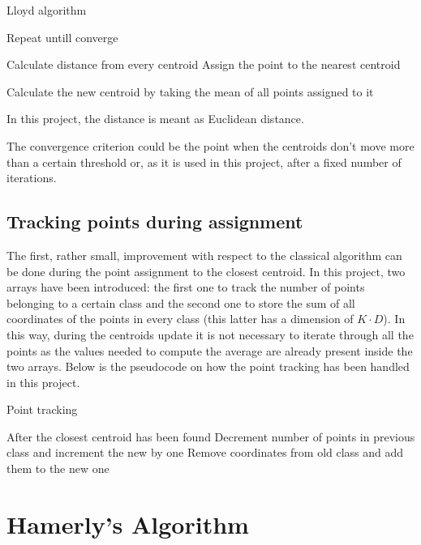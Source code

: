 \documentclass[conference]{IEEEtran}
\begin{document}
\begin{algorithm}[H]
  \caption{Lloyd algorithm}
  \begin{algorithmic}
    \State Repeat untill converge

      \State Calculate distance from every centroid
      \State Assign the point to the nearest centroid
    \EndFor 

      \State Calculate the new centroid by taking the mean of all points assigned to it
    \EndFor 
  \end{algorithmic}
\end{algorithm}

In this project, the distance is meant as Euclidean distance.

The convergence criterion could be the point when the centroids don't move more than a certain threshold or, as it is used in this project, after a fixed number of iterations.

\subsection{Tracking points during assignment}
The first, rather small, improvement with respect to the classical algorithm can be done during the point assignment to the closest centroid. In this project, two arrays have been introduced: the first one to track the number of points belonging to a certain class and the second one to store the sum of all coordinates of the points in every class (this latter has a dimension of $K \cdot D$). In this way, during the centroids update it is not necessary to iterate through all the points as the values needed to compute the average are already present inside the two arrays. Below is the pseudocode on how the point tracking has been handled in this project.

\begin{algorithm}[H]
    \caption{Point tracking}
    \begin{algorithmic}
      \State After the closest centroid has been found
        \State Decrement number of points in previous class and increment the new by one
        \State Remove coordinates from old class and add them to the new one
      \EndIf
    \end{algorithmic}
  \end{algorithm}
  
\section{Hamerly's Algorithm}
\end{document}
